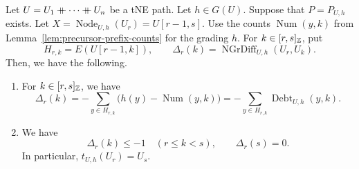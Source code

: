 \begin{lemma}\label{lem:node-debt-sum}
Let $U=U_1\mathbin{+\mkern-10mu+}\cdots\mathbin{+\mkern-10mu+} U_n$ be a tNE path. Let $h\in G(U)$. Suppose that
$P=P_{U,h}$ exists. Let $X=\operatorname{Node}_{U,h}(U_r)=U[r-1,s]$.
Use the counts $\operatorname{Num}(y,k)$ from Lemma~\ref{lem:precursor-prefix-counts} for the grading $h$.
For $k\in[r,s]_{\mathbb Z}$, put
\[
 H_{r,k}=E(U[r-1,k]),\qquad
 \Delta_r(k)=\operatorname{NGrDiff}_{U,h}(U_r,U_k).
\]
Then, we have the following.
\begin{enumerate}
\item\label{c:node-debt-identity} For $k\in[r,s]_{\mathbb Z}$, we have
\[
 \Delta_r(k)=-\sum_{y\in H_{r,k}}\bigl(h(y)-\operatorname{Num}(y,k)\bigr)
 =-\sum_{y\in H_{r,k}}\operatorname{Debt}_{U,h}(y,k).
\]
\item\label{c:node-debt-first-zero} We have
\[
 \Delta_r(k)\le-1\quad(r\le k<s),\qquad \Delta_r(s)=0.
\]
In particular, $t_{U,h}(U_r)=U_s$.
\end{enumerate}
\end{lemma}
